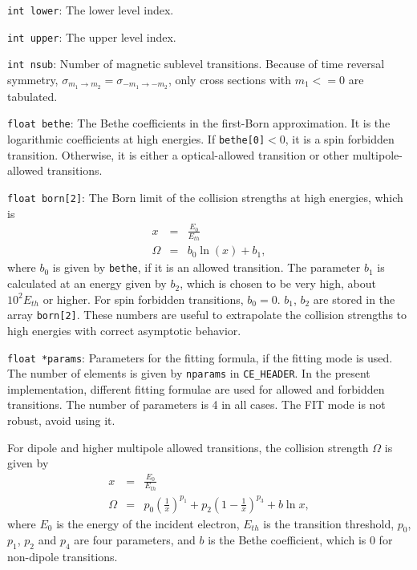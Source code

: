 \begin{dbdesc}
\item[\texttt{int lower}:] The lower level index.
\item[\texttt{int upper}:] The upper level index.
\item[\texttt{int nsub}:] Number of magnetic sublevel transitions. Because of
time reversal symmetry, $\sigma_{m_1\to m_2}=\sigma_{-m_1\to -m_2}$, only cross
sections with $m_1 <= 0$ are tabulated.
\item[\texttt{float bethe}:] The Bethe coefficients in the first-Born
approximation. It is the logarithmic coefficients at high energies. If
\texttt{bethe[0]}$<0$, it is a spin forbidden transition. Otherwise, it is
either a optical-allowed transition or other multipole-allowed transitions.
\item[\texttt{float born[2]}:] The Born limit of the collision strengths at
high energies, which is
\begin{eqnarray}
x &=& \frac{E_0}{E_{th}} \nonumber\\
\Omega &=& b_0\ln(x) + b_1,
\end{eqnarray}
where $b_0$ is given by \texttt{bethe}, if it is an allowed transition. The
parameter $b_1$ is calculated at an energy given by $b_2$, which is chosen to
be very high, about $10^{2}E_{th}$ or higher.
For spin forbidden transitions, $b_0 = 0$. $b_1$, $b_2$ are stored in the array
\texttt{born[2]}. These numbers are useful to extrapolate the collision
strengths to high energies with correct asymptotic behavior.
\item[\texttt{float *params}:] Parameters for the fitting formula, if the
fitting mode is used. The number of elements is given by \texttt{nparams} in
\texttt{CE\_HEADER}. In the present implementation, different fitting formulae
are used for allowed and forbidden transitions. The number of parameters is 4
in all cases. The FIT mode is not robust, avoid using it.

For dipole and higher multipole allowed transitions, the
collision strength $\Omega$ is given by
\begin{eqnarray}
x &=& \frac{E_0}{E_{th}} \nonumber\\
\Omega &=& p_0\left(\frac{1}{x}\right)^{p_1} + 
p_2\left(1-\frac{1}{x}\right)^{p_3} + b\ln x,
\end{eqnarray}
where $E_0$ is the energy of the incident electron, $E_{th}$ is the transition
threshold, $p_0$, $p_1$, $p_2$ and $p_4$ are four parameters, and $b$ is the
Bethe coefficient, which is 0 for non-dipole transitions.


\end{dbdesc}
